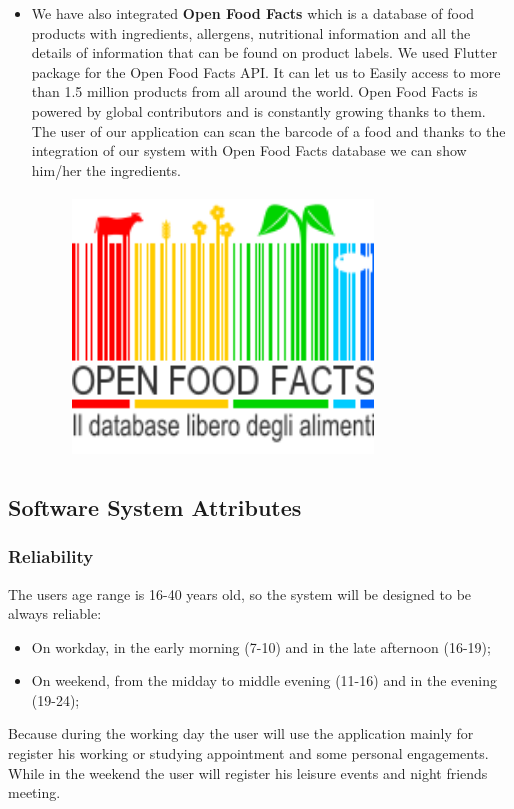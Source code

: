 \documentclass [12pt]{article}
\begin{document}
\begin{itemize}
\item We have also integrated  \textbf{Open Food Facts} which is a database of food products with ingredients, allergens, nutritional information and all the details of information that can be found on product labels.
We used Flutter package for the Open Food Facts API. It can let us to Easily access to more than 1.5 million products from all around the world. Open Food Facts is powered by global contributors and is constantly growing thanks to them.
The user of our application can scan the barcode of a food and thanks to the integration of our system with Open Food Facts database we can show him/her the ingredients.
\begin{figure}[ht!]
\centering
\includegraphics[height=7cm, width=8cm]{openfoodfacts.png}
\end{figure}

\end{itemize}


\subsection{Software System Attributes} 

\subsubsection{Reliability}
The users age range is 16-40 years old, so the system will be designed to be always reliable:
\begin{itemize}
\item On workday, in the early morning (7-10) and in the late afternoon (16-19); 
\item On weekend, from the midday to middle evening (11-16) and in the evening (19-24);
\end{itemize}
Because during the working day the user will use the application mainly for register his working or studying appointment and some personal engagements.\\
While in the weekend the user will register his leisure events and night friends meeting.
\end{document}
